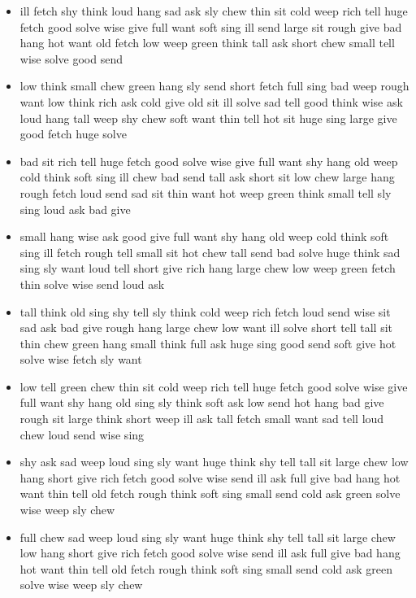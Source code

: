 \documentclass[10pt,letterpaper]{article}
\begin{document}
\begin{itemize}
  \item ill fetch shy think loud hang sad ask sly chew thin sit cold
    weep rich tell huge fetch good solve wise give full want soft sing
    ill send large sit rough give bad hang hot want old fetch low weep
    green think tall ask short chew small tell wise solve good send

  \item low think small chew green hang sly send short fetch full sing
    bad weep rough want low think rich ask cold give old sit ill solve
    sad tell good think wise ask loud hang tall weep shy chew soft
    want thin tell hot sit huge sing large give good fetch huge solve

  \item bad sit rich tell huge fetch good solve wise give full want
    shy hang old weep cold think soft sing ill chew bad send tall ask
    short sit low chew large hang rough fetch loud send sad sit thin
    want hot weep green think small tell sly sing loud ask bad give

  \item small hang wise ask good give full want shy hang old weep cold
    think soft sing ill fetch rough tell small sit hot chew tall send
    bad solve huge think sad sing sly want loud tell short give rich
    hang large chew low weep green fetch thin solve wise send loud ask

  \item tall think old sing shy tell sly think cold weep rich fetch
    loud send wise sit sad ask bad give rough hang large chew low want
    ill solve short tell tall sit thin chew green hang small think
    full ask huge sing good send soft give hot solve wise fetch sly
    want

  \item low tell green chew thin sit cold weep rich tell huge fetch
    good solve wise give full want shy hang old sing sly think soft
    ask low send hot hang bad give rough sit large think short weep
    ill ask tall fetch small want sad tell loud chew loud send wise
    sing

  \item shy ask sad weep loud sing sly want huge think shy tell tall
    sit large chew low hang short give rich fetch good solve wise send
    ill ask full give bad hang hot want thin tell old fetch rough
    think soft sing small send cold ask green solve wise weep sly chew

  \item \color{red}full chew sad weep loud sing sly want huge think shy tell tall
    sit large chew low hang short give rich fetch good solve wise send
    ill ask full give bad hang hot want thin tell old fetch rough
    think soft sing small send cold ask green solve wise weep sly chew\color{black}
    

\end{itemize}
\end{document}
